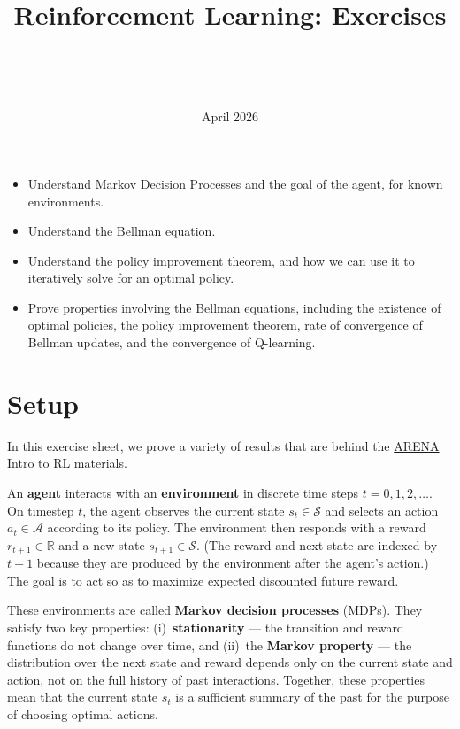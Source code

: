 \documentclass[11pt]{article}
\title{Reinforcement Learning: Exercises}
\author{\authorname{Leon Lang}\\ \affiliation{Iliad}
  \and \authorname{David Quarel}\\ \affiliation{ARENA}}
\date{April 2026}
\newcommand{\cS}{\mathcal{S}}
\newcommand{\cA}{\mathcal{A}}
\begin{document}
\maketitle

\begin{learningoutcomes}
  \begin{itemize}
    \item Understand Markov Decision Processes and the goal of the agent, for
      known environments.
    \item Understand the Bellman equation.
    \item Understand the policy improvement theorem, and how we can use it to
      iteratively solve for an optimal policy.
    \item Prove properties involving the Bellman equations, including the
      existence of optimal policies, the policy improvement theorem, rate of
      convergence of Bellman updates, and the convergence of Q-learning.
  \end{itemize}
\end{learningoutcomes}


\section*{Setup}
In this exercise sheet, we prove a variety of results that are behind the \href{https://learn.arena.education/chapter2_rl/01_intro_rl/}{ARENA Intro to RL materials}. 

An \textbf{agent} interacts with an \textbf{environment} in discrete time steps $t = 0, 1, 2, \ldots$. On timestep $t$, the agent observes the current state $s_t \in \cS$ and selects an action $a_t \in \cA$ according to its policy. The environment then responds with a reward $r_{t+1} \in \mathbb{R}$ and a new state $s_{t+1} \in \cS$. (The reward and next state are indexed by $t+1$ because they are produced by the environment after the agent's action.) The goal is to act so as to maximize expected discounted future reward.

These environments are called \textbf{Markov decision processes} (MDPs). They satisfy two key properties: (i)~\textbf{stationarity} --- the transition and reward functions do not change over time, and (ii)~the \textbf{Markov property} --- the distribution over the next state and reward depends only on the current state and action, not on the full history of past interactions. Together, these properties mean that the current state $s_t$ is a sufficient summary of the past for the purpose of choosing optimal actions.
\end{document}
